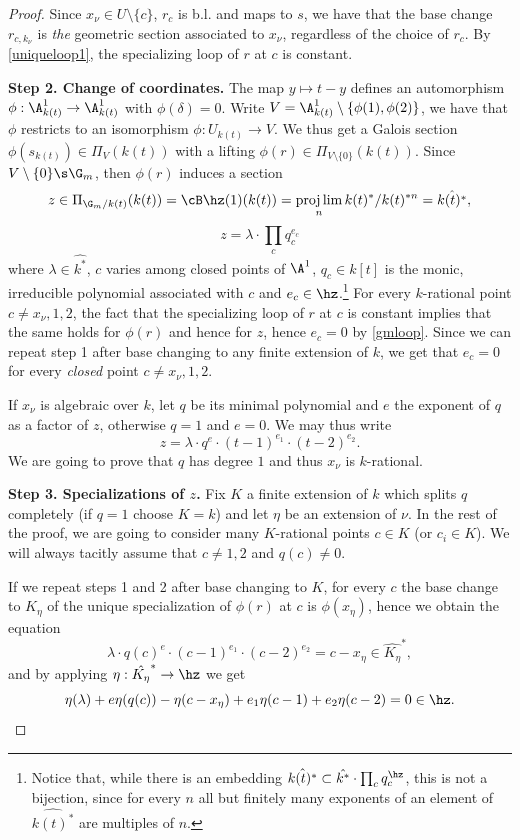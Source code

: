 \begin{proposition}
\begin{proof}
		Since $x_{\nu}\in U\setminus\{c\}$, $r_{c}$ is b.l. and maps to $s$, we have that the base change $r_{c,k_{\nu}}$ is \emph{the} geometric section associated to $x_{\nu}$, regardless of the choice of $r_{c}$. By \autoref{uniqueloop1}, the specializing loop of $r$ at $c$ is constant.


		\textbf{Step 2. Change of coordinates.} The map $y\mapsto t-y$ defines an automorphism $\phi:\A^{1}_{k(t)}\to\A^{1}_{k(t)}$ with $\phi(\delta)=0$. Write $V=\A^{1}_{k(t)}\setminus\{\phi(1),\phi(2)\}$, we have that $\phi$ restricts to an isomorphism $\phi:U_{k(t)}\to V$. We thus get a Galois section $\phi(s_{k(t)})\in\Pi_{V}(k(t))$ with a lifting $\phi(r)\in\Pi_{V\setminus \{0\}}(k(t))$. Since $V\setminus\{0\}\s\G_{m}$, then $\phi(r)$ induces a section
		\[z\in\Pi_{\G_{m}/k(t)}(k(t))=\cB\hz(1)(k(t))=\projlim_{n} k(t)^*/k(t)^{*n}=\hat{k(t)^*},\]
		\[z=\lambda\cdot\prod_{c}q_{c}^{e_{c}}\]
		where $\lambda\in\hat{k^*}$, $c$ varies among closed points of $\A^{1}$, $q_{c}\in k[t]$ is the monic, irreducible polynomial associated with $c$ and $e_{c}\in\hz$.\footnote{Notice that, while there is an embedding $\hat{k(t)^{*}}\subset \hat{k^{*}}\cdot\prod_{c}q_{c}^{\hz}$, this is not a bijection, since for every $n$ all but finitely many exponents of an element of $\hat{k(t)^{*}}$ are multiples of $n$.} For every $k$-rational point $c\neq x_{\nu},1,2$, the fact that the specializing loop of $r$ at $c$ is constant implies that the same holds for $\phi(r)$ and hence for $z$, hence $e_{c}=0$ by \autoref{gmloop}. Since we can repeat step 1 after base changing to any finite extension of $k$, we get that $e_{c}=0$ for every \emph{closed} point $c\neq x_{\nu},1,2$.

		If $x_{\nu}$ is algebraic over $k$, let $q$ be its minimal polynomial and $e$ the exponent of $q$ as a factor of $z$, otherwise $q=1$ and $e=0$. We may thus write
		\[z=\lambda\cdot q^{e}\cdot(t-1)^{e_{1}}\cdot(t-2)^{e_{2}}.\]
		We are going to prove that $q$ has degree $1$ and thus $x_{\nu}$ is $k$-rational.


		\textbf{Step 3. Specializations of $z$.} Fix $K$ a finite extension of $k$ which splits $q$ completely (if $q=1$ choose $K=k$) and let $\eta$ be an extension of $\nu$. In the rest of the proof, we are going to consider many $K$-rational points $c\in K$ (or $c_{i}\in K$). We will always tacitly assume that $c\neq 1,2$ and $q(c)\neq 0$.

		If we repeat steps 1 and 2 after base changing to $K$, for every $c$ the base change to $K_{\eta}$ of the unique specialization of $\phi(r)$ at $c$ is $\phi(x_{\eta})$, hence we obtain the equation
		\[\lambda\cdot q(c)^{e}\cdot(c-1)^{e_{1}}\cdot(c-2)^{e_{2}}=c-x_{\eta}\in\hat{K_{\eta}}^{*},\]
		and by applying $\eta:\hat{K_{\eta}}^{*}\to\hz$ we get
		\[\eta(\lambda)+e\eta(q(c))-\eta(c-x_{\eta})+e_{1}\eta(c-1)+e_{2}\eta(c-2)=0\in\hz.\]


\end{proof}
\end{proposition}
